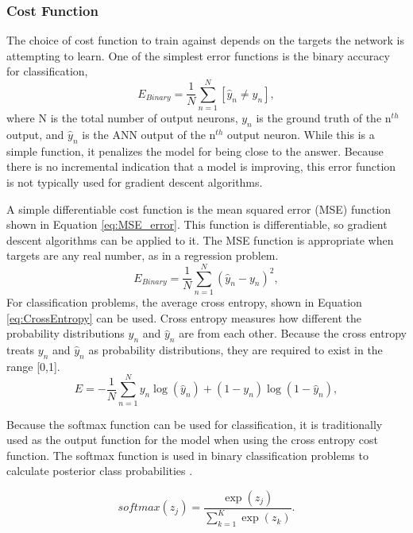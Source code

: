 \subsubsection{Cost Function}

The choice of cost function to train against depends on the targets the network is attempting to learn. One of the simplest error functions is the binary accuracy for classification, 
%
\begin{equation} \label{eq:Binary_accuracy}
E_{Binary} = {\frac{1} N} \sum_{n=1}^N [\hat{y}_n \neq y_n ],
\end{equation}
%
where N is the total number of output neurons, $y_n$ is the ground truth of the n$^{th}$ output, and $\hat{y}_n$ is the ANN output of the n$^{th}$ output neuron. While this is a simple function, it penalizes the model for being close to the answer. Because there is no incremental indication that a model is improving, this error function is not typically used for gradient descent algorithms.

A simple differentiable cost function is the mean squared error (MSE) function shown in Equation \ref{eq:MSE_error}. This function is differentiable, so gradient descent algorithms can be applied to it. The MSE function is appropriate when targets are any real number, as in a regression problem. 
%
\begin{equation} \label{eq:MSE_error}
E_{Binary} = {\frac{1} N} \sum_{n=1}^N (\hat{y}_n - y_n)^2,
\end{equation}
%
For classification problems, the average cross entropy, shown in Equation \ref{eq:CrossEntropy} can be used. Cross entropy measures how different the probability distributions $y_n$ and $\hat{y}_n$ are from each other. Because the cross entropy treats $y_n$ and $\hat{y}_n$ as probability distributions, they are required to exist in the range [0,1].
%
\begin{equation} \label{eq:CrossEntropy}
E = -{\frac{1} N} \sum_{n=1}^N y_n \log(\hat{y}_n) +  (1-y_n) \log(1-\hat{y}_n), 
\end{equation}
%

Because the softmax function can be used for classification, it is traditionally used as the output function for the model when using the cross entropy cost function. The softmax function is used in binary classification problems to calculate posterior class probabilities \cite{Bridle1990}.

\begin{equation} \label{eq:softmax}
softmax(z_j) = \frac{\exp(z_j)} {\sum_{k=1}^{K} \exp(z_k)}.
\end{equation}


